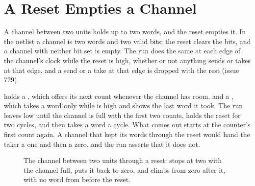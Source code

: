 \section{A Reset Empties a Channel}
\label{sec:x-flush}

A channel between two units holds up to two words, and the reset
empties it. In the netlist a channel is two words and two valid bits;
the reset clears the bits, and a channel with neither bit set is
empty. The run does the same at each edge of the channel's clock while
the reset is high, whether or not anything sends or takes at that
edge, and a send or a take at that edge is dropped with the rest
(issue 729).

 holds a , which offers its next count
whenever the channel has room, and a , which takes a word
only while  is high and shows the last word it took. The
run leaves  low until the channel is full with the first
two counts, holds the reset for two cycles, and then takes a word a
cycle. What comes out starts at the counter's first count again. A
channel that kept its words through the reset would hand the taker a
one and then a zero, and the run asserts that it does not.

\begin{figure}[htbp]
\centering

\caption{The channel between two units through a reset: 
stops at two with the channel full,  puts it back to zero,
and  climbs from zero after it, with no word from before
the reset.}
\label{fig:x-flush}
\end{figure}




